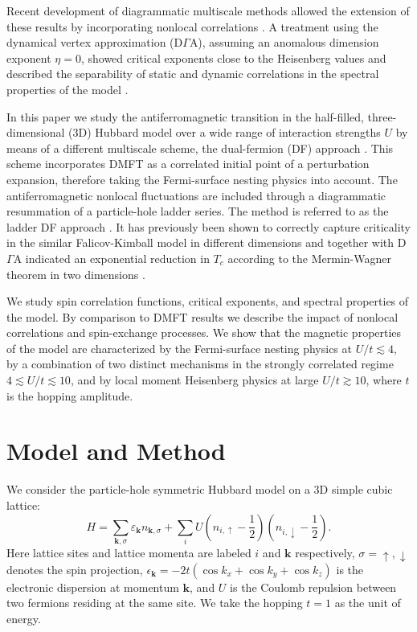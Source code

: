 \documentclass[aps,prb,twocolumn,amsmath,notitlepage,floatfix,footinbib,superscriptaddress,showpacs, showkeys]{revtex4-1}
\newcommand{\kay}{\mathbf{k}}
\newcommand{\up}{\uparrow}
\newcommand{\down}{\downarrow}
\begin{document}
Recent development of diagrammatic multiscale methods allowed the extension of these results by incorporating nonlocal correlations  \cite{Toschi2007,Rubtsov2008, Slezak2009,Rohringer2013,Taranto2013}.
A treatment using the dynamical vertex approximation (D$\Gamma$A), assuming an anomalous dimension exponent $\eta = 0$, showed critical exponents close to the Heisenberg values \cite{Rohringer2011} and described the separability of static and dynamic correlations in the spectral properties of the model \cite{Schafer2015}.

In this paper we study the antiferromagnetic transition in the half-filled, three-dimensional ($3$D) Hubbard model over a wide range of interaction strengths $U$ by means of a different multiscale scheme, the dual-fermion (DF) approach \cite{Rubtsov2008, HafermannLi2009}.
This scheme incorporates DMFT as a correlated initial point of a perturbation  expansion, therefore taking the Fermi-surface nesting physics into account.
The antiferromagnetic nonlocal fluctuations are included through a diagrammatic resummation of a particle-hole ladder series. The method is referred to as the ladder DF approach \cite{HafermannLi2009}. 
It has previously been shown to correctly capture criticality in the similar Falicov-Kimball model in different dimensions \cite{Antipov2014} and together with D$\Gamma$A indicated an exponential reduction in $T_c$ according to the Mermin-Wagner theorem in two dimensions \cite{Otsuki2014,Schaefer2015b}.  

We study spin correlation functions, critical exponents, and spectral properties of the model. 
By comparison to DMFT results we describe the impact of nonlocal correlations and spin-exchange processes. 
We show that the magnetic properties of the model are characterized by the Fermi-surface nesting physics at $U/t \lesssim 4$, by a combination of two distinct mechanisms in the strongly correlated regime $4 \lesssim U/t \lesssim 10$, and by local moment Heisenberg physics at large  $U/t\gtrsim 10$, where $t$ is the hopping amplitude.

\section{Model and Method}

We consider the particle-hole symmetric Hubbard model on a 3D simple cubic lattice: 
\begin{equation}\label{eq:hubbard}
H=\sum_{\kay, \sigma} \varepsilon_{\kay} n_{\kay,\sigma} + \sum_i U (n_{i,\uparrow} - \frac{1}{2}) (n_{i,\downarrow} - \frac{1}{2}).
\end{equation}
Here lattice sites and lattice momenta are labeled $i$ and $\kay$ respectively, $\sigma=\up,\down$ denotes the spin projection, $\epsilon_\kay = -2t(\cos k_x + \cos k_y + \cos k_z)$ is the electronic dispersion at momentum $\kay$, and $U$ is the Coulomb repulsion between two fermions residing at the same site. 
We take the hopping $t = 1$ as the unit of energy. 
\end{document}
